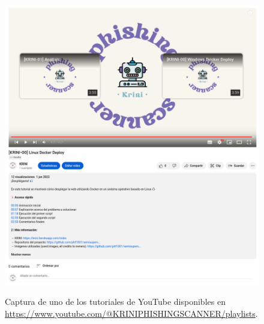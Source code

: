 \begin{figure}[h]
	\caption[Manual de usuario: canal de YouTube]{Captura de uno de los tutoriales de YouTube disponibles en \url{https://www.youtube.com/@KRINIPHISHINGSCANNER/playlists}.}
	\centering
	\includegraphics[width=\textwidth]{../img/anexos/user_guide/9_yt}
	\label{e-9:krini-yt}
\end{figure}
